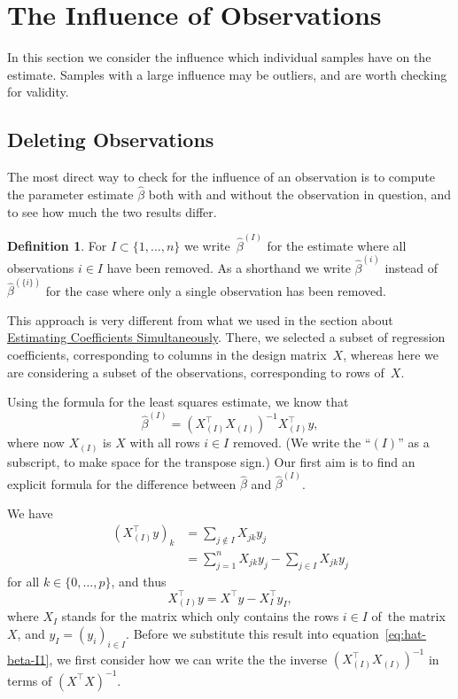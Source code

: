 \documentclass[
  a4paper,
]{article}
\theoremstyle{definition}
\newtheorem{definition}{Definition}[section]
\theoremstyle{definition}
\theoremstyle{definition}
\theoremstyle{definition}
\theoremstyle{remark}
\begin{document}
\clearpage

\hypertarget{S09-influence}{%
\section{The Influence of Observations}\label{S09-influence}}

In this section we consider the influence which individual samples have on
the estimate. Samples with a large influence may be outliers, and are
worth checking for validity.

\hypertarget{deleting-observations}{%
\subsection{Deleting Observations}\label{deleting-observations}}

The most direct way to check for the influence of an observation
is to compute the parameter estimate \(\hat\beta\) both with and without
the observation in question, and to see how much the two results differ.

\begin{definition}
For \(I \subset \{1, \ldots, n\}\) we write~\(\hat\beta^{(I)}\) for the estimate
where all observations \(i\in I\) have been removed. As a shorthand we write
\(\hat\beta^{(i)}\) instead of \(\hat\beta^{(\{i\})}\) for the case where only
a single observation has been removed.
\end{definition}

This approach is very different from what we used in the
section about \protect\hyperlink{S06-simultaneous}{Estimating Coefficients Simultaneously}. There, we selected a
subset of regression coefficients, corresponding to columns in the design
matrix~\(X\), whereas here we are considering a subset of the observations,
corresponding to rows of~\(X\).

Using the formula for the least squares estimate, we know that
\begin{equation}
  \hat\beta^{(I)}
  = (X_{(I)}^\top X_{(I)})^{-1} X_{(I)}^\top y,  \label{eq:hat-beta-I1}
\end{equation}
where now \(X_{(I)}\) is \(X\) with all rows \(i\in I\) removed. (We write the
``\((I)\)'' as a subscript, to make space for the transpose sign.) Our first aim
is to find an explicit formula for the difference between \(\hat\beta\) and
\(\hat\beta^{(I)}\).

We have
\begin{align*}
  (X_{(I)}^\top y)_k
  &= \sum_{j \notin I} X_{jk} y_j \\
  &= \sum_{j=1}^n X_{jk} y_j - \sum_{j\in I} X_{jk} y_j
\end{align*}
for all \(k \in \{0, \ldots, p\}\), and thus
\begin{equation}
  X_{(I)}^\top y
  = X^\top y - X_I^\top y_I,  \label{eq:X-I-top-y}
\end{equation}
where \(X_I\) stands for the matrix which only contains the rows \(i\in I\) of~the
matrix \(X\), and \(y_I = (y_i)_{i\in I}\). Before we substitute this result into
equation~\eqref{eq:hat-beta-I1}, we first consider how we can write the the
inverse \((X_{(I)}^\top X_{(I)})^{-1}\) in terms of \((X^\top X)^{-1}\).
\end{document}
